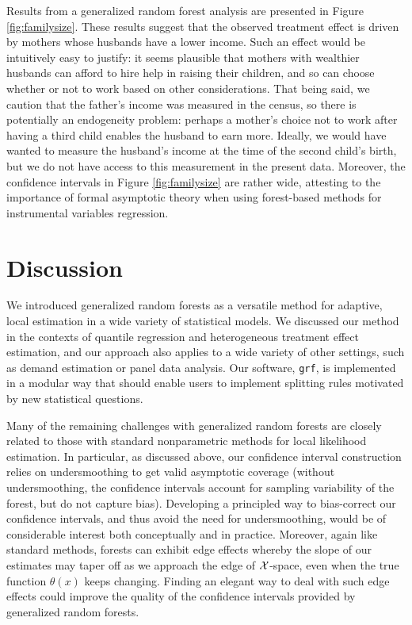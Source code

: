 \documentclass[aos]{imsart}
\theoremstyle{plain}
\theoremstyle{definition}
\theoremstyle{remark}
\begin{document}
\begin{CJK}{UTF8}{gbsn}
{Results from a generalized random forest analysis are presented in Figure \ref{fig:familysize}. These results suggest that
the observed treatment effect is driven by mothers whose husbands have a lower income. Such an effect would
be intuitively easy to justify: it seems plausible that mothers with wealthier husbands can afford to hire help in raising their children,
and so can choose whether or not to work based on other considerations. That being said, we caution
that the father's income was measured in the census, so there is potentially an endogeneity
problem: perhaps a mother's choice not to work after having a third child enables the husband to earn more.
Ideally, we would have wanted to measure the husband's income at the time of the second child's birth, but
we do not have access to this measurement in the present data. Moreover, the confidence intervals in Figure \ref{fig:familysize}
are rather wide, attesting to the importance of formal asymptotic theory when using forest-based methods for instrumental
variables regression.

\section{Discussion}

We introduced generalized random forests as a versatile method for adaptive,
local estimation in a wide variety of statistical models. We discussed our method
in the contexts of quantile regression and heterogeneous treatment effect estimation,
and our approach also applies to a wide variety of other settings, such as
demand estimation or panel data analysis. Our software, \texttt{grf},
is implemented in a modular way that should enable users to implement
splitting rules motivated by new statistical questions.

Many of the remaining challenges with generalized random forests are closely related to
those with standard nonparametric methods for local likelihood estimation. In particular, as discussed
above, our confidence interval construction relies on undersmoothing to get valid asymptotic
coverage (without undersmoothing, the confidence intervals account for sampling variability of
the forest, but do not capture bias). Developing a principled way to bias-correct our confidence
intervals, and thus avoid the need for undersmoothing, would be of considerable interest both
conceptually and in practice. Moreover, again like standard methods, forests can exhibit edge
effects whereby the slope of our estimates  may taper off
as we approach the edge of $\mathcal{X}$-space, even when the true function $\theta(x)$ keeps
changing. Finding an elegant way to deal with such edge effects could improve the
quality of the confidence intervals provided by generalized random forests.

}
\end{CJK}
\end{document}
